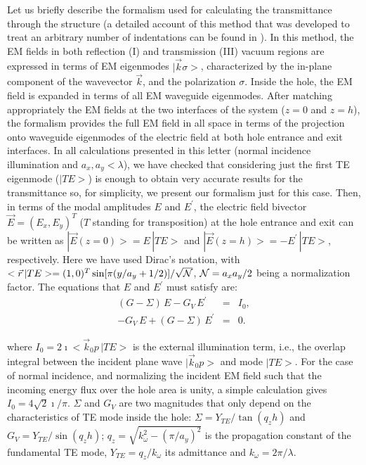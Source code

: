 \documentclass[aps,prl,twocolumn,showpacs,superscriptaddress,floatfix]{revtex4}
\begin{document}
Let us briefly describe the formalism used for calculating the
transmittance through the structure (a detailed account of this
method that was developed to treat an arbitrary number of
indentations can be found in \cite{Bravo}). In this method, the EM
fields in both reflection (I) and transmission (III) vacuum
regions are expressed in terms of EM eigenmodes $|\vec{k}\sigma>$,
characterized by the in-plane component of the wavevector
$\vec{k}$, and the polarization $\sigma$. Inside the hole, the EM
field is expanded in terms of all EM waveguide eigenmodes. After
matching appropriately the EM fields at the two interfaces of the
system ($z=0$ and $z=h$), the formalism provides the full EM field
in all space in terms of the projection onto waveguide eigenmodes
of the electric field at both hole entrance and exit interfaces.
In all calculations presented in this letter (normal incidence
illumination and $a_x, a_y < \lambda$), we have checked that
considering just the first TE eigenmode ($|TE>$) is enough to
obtain very accurate results for the transmittance so, for
simplicity, we present our formalism just for this case. Then, in
terms of the modal amplitudes $E$ and $E^{\prime}$, the electric
field bivector $\vec{E} = (E_x, E_y)^T$ ($T$ standing for
transposition) at the hole entrance and exit can be written as
$|\vec{E}(z=0)> = E \, |TE >$ and $|\vec{E}(z=h)> = - E^{\prime}\,
|TE >$, respectively. Here we have used Dirac's notation, with
$<\vec{r}\,|TE>= (1, 0)^T \sin[\pi(y/a_y+1/2)] / \sqrt{\cal{N}}$,
 ${\cal{N}}= a_x a_y /2$ being a normalization factor.
The equations that $E$ and $E^{\prime}$ must satisfy are:
\begin{eqnarray}
(G-\Sigma)\, E-G_V\, E^{\prime}&=&I_0, \nonumber \\
-G_V\, E+(G-\Sigma)\, E^{\prime}&=&0 \label{system_of_eq}.
\end{eqnarray}

\noindent where $I_0= 2 \imath <\vec{k}_0 p\, |TE>$ is the
external illumination term, i.e.,  the overlap integral between
the incident plane wave $|\vec{k}_0 p>$ and mode $|TE>$. For the
case of normal incidence, and normalizing the incident EM field
such that the incoming energy flux over the hole area is unity, a
simple calculation gives $I_0=4\sqrt{2}\imath/\pi$. $\Sigma$ and
$G_V$ are two magnitudes that only depend on the characteristics
of TE mode inside the hole: $\Sigma=Y_{TE}/\tan(q_z h)$ and
$G_V=Y_{TE}/\sin(q_z h)$; $q_z=\sqrt{k_{\omega}^2-(\pi/a_y)^2}$ is
the propagation constant of the fundamental TE mode, $Y_{TE}=
q_z/k_\omega$ its admittance and $k_\omega=2 \pi/ \lambda$.
\end{document}
